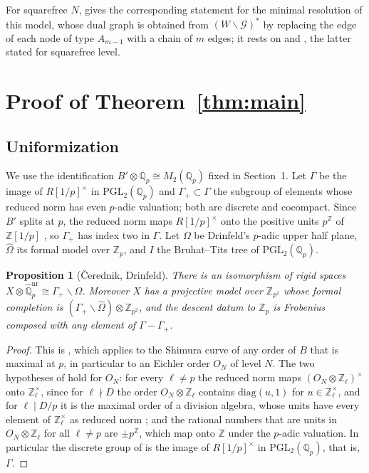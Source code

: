 \documentclass[11pt]{amsart}
\theoremstyle{plain}
\newtheorem{proposition}[theorem]{Proposition}
\theoremstyle{remark}
\newcommand{\Z}{\mathbb{Z}}
\newcommand{\Qp}{\mathbb{Q}_p}
\newcommand{\Qpnr}{\widehat{\mathbb{Q}}_p^{\mathrm{nr}}}
\newcommand{\Ohat}{\widehat{\Omega}}
\newcommand{\PGL}{\mathrm{PGL}}
\begin{document}
For squarefree $N$, \cite[Theorem~2.6]{PS} gives the corresponding statement for the minimal resolution of this model, whose dual graph is obtained from $(W\backslash\mathcal{G})^*$ by replacing the edge of each node of type $A_{m-1}$ with a chain of $m$ edges; it rests on \cite[p.~202]{Ogg} and \cite[Theorem~1.3]{BD}, the latter stated for squarefree level.

\section{Proof of Theorem~\ref{thm:main}}\label{sec:proof}

\subsection{Uniformization}

We use the identification $B' \otimes \Qp \cong M_2(\Qp)$ fixed in Section~1. Let $\Gamma$ be the image of $R[1/p]^\times$ in $\PGL_2(\Qp)$ and $\Gamma_+ \subset \Gamma$ the subgroup of elements whose reduced norm has even $p$-adic valuation; both are discrete and cocompact. Since $B'$ splits at $p$, the reduced norm maps $R[1/p]^\times$ onto the positive units $p^{\Z}$ of $\Z[1/p]$ \cite[Corollary~28.6.4]{Voi}, so $\Gamma_+$ has index two in $\Gamma$. Let $\Omega$ be Drinfeld's $p$-adic upper half plane, $\Ohat$ its formal model over $\Z_p$, and $I$ the Bruhat--Tits tree of $\PGL_2(\Qp)$.

\begin{proposition}[\v{C}erednik, Drinfeld]\label{prop:BC}
There is an isomorphism of rigid spaces $X \otimes \Qpnr \cong \Gamma_+\backslash\Omega$. Moreover $X$ has a projective model over $\Z_{p^2}$ whose formal completion is $(\Gamma_+\backslash\Ohat) \otimes \Z_{p^2}$, and the descent datum to $\Z_p$ is Frobenius composed with any element of $\Gamma - \Gamma_+$.
\end{proposition}

\begin{proof}
This is \cite[III, Theorem~(5.2) and 5.3.2--5.3.3]{BC}, which applies to the Shimura curve of any order of $B$ that is maximal at $p$, in particular to an Eichler order $O_N$ of level $N$. The two hypotheses of \cite[III, 5.3.3]{BC} hold for $O_N$: for every $\ell \neq p$ the reduced norm maps $(O_N \otimes \Z_\ell)^\times$ onto $\Z_\ell^\times$, since for $\ell \nmid D$ the order $O_N \otimes \Z_\ell$ contains $\mathrm{diag}(u, 1)$ for $u \in \Z_\ell^\times$, and for $\ell \mid D/p$ it is the maximal order of a division algebra, whose units have every element of $\Z_\ell^\times$ as reduced norm \cite[Lemma~13.4.9]{Voi}; and the rational numbers that are units in $O_N \otimes \Z_\ell$ for all $\ell \neq p$ are $\pm p^{\Z}$, which map onto $\Z$ under the $p$-adic valuation. In particular the discrete group of \cite[III, 5.3.3]{BC} is the image of $R[1/p]^\times$ in $\PGL_2(\Qp)$, that is, $\Gamma$.
\end{proof}
\end{document}
